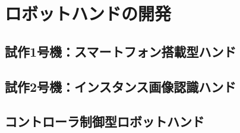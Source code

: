 \chapter{ロボットハンドの開発}
\label{chap_result}

\section{試作1号機：スマートフォン搭載型ハンド}


\section{試作2号機：インスタンス画像認識ハンド}


\section{コントローラ制御型ロボットハンド}

